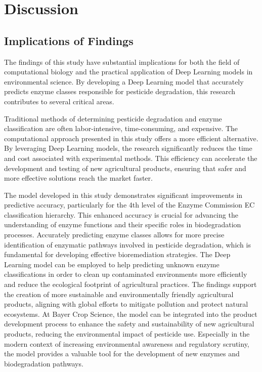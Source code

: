 \section{Discussion}

\subsection{Implications of Findings}
\label{sec:Implications of Findings}

The findings of this study have substantial implications for both the field of computational biology and the practical application of Deep Learning models in environmental science. By developing a Deep Learning model that accurately predicts enzyme classes responsible for pesticide degradation, this research contributes to several critical areas.

Traditional methods of determining pesticide degradation and enzyme classification are often labor-intensive, time-consuming, and expensive. The computational approach presented in this study offers a more efficient alternative. By leveraging Deep Learning models, the research significantly reduces the time and cost associated with experimental methods. This efficiency can accelerate the development and testing of new agricultural products, ensuring that safer and more effective solutions reach the market faster.

The model developed in this study demonstrates significant improvements in predictive accuracy, particularly for the 4th level of the Enzyme Commission EC classification hierarchy. This enhanced accuracy is crucial for advancing the understanding of enzyme functions and their specific roles in biodegradation processes. Accurately predicting enzyme classes allows for more precise identification of enzymatic pathways involved in pesticide degradation, which is fundamental for developing effective bioremediation strategies. The Deep Learning model can be employed to help predicting unknown enzyme classifications in order to clean up contaminated environments more efficiently and reduce the ecological footprint of agricultural practices. The findings support the creation of more sustainable and environmentally friendly agricultural products, aligning with global efforts to mitigate pollution and protect natural ecosystems. At Bayer Crop Science, the model can be integrated into the product development process to enhance the safety and sustainability of new agricultural products, reducing the environmental impact of pesticide use. Especially in the modern context of increasing environmental awareness and regulatory scrutiny, the model provides a valuable tool for the development of new enzymes and biodegradation pathways.


